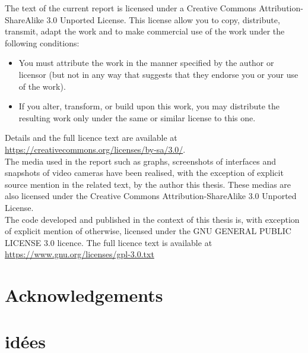 The text of the current report is licensed under a Creative Commons Attribution-ShareAlike 3.0 Unported License.
This license allow you to copy, distribute, transmit, adapt the work and to make commercial use of the work under the following conditions:

\begin{itemize}
\item You must attribute the work in the manner specified by the author or licensor (but not in any way that suggests that they endorse you or your use of the work).
\item  If you alter, transform, or build upon this work, you may distribute the resulting work only under the same or similar license to this one. 
\end{itemize}

Details and the full licence text are available at \url{https://creativecommons.org/licenses/by-sa/3.0/}.\\

The media used in the report such as graphs, screenshots of interfaces and snapshots of video cameras have been realised, with the exception of explicit source mention in the related text, by the author this thesis.
These medias are also licensed under the Creative Commons Attribution-ShareAlike 3.0 Unported License.\\

The code developed and published in the context of this thesis is, with exception of explicit mention of otherwise, licensed under the GNU GENERAL PUBLIC LICENSE 3.0 licence. The full licence text is available at \url{https://www.gnu.org/licenses/gpl-3.0.txt}

\section{Acknowledgements}


\section{idées}

